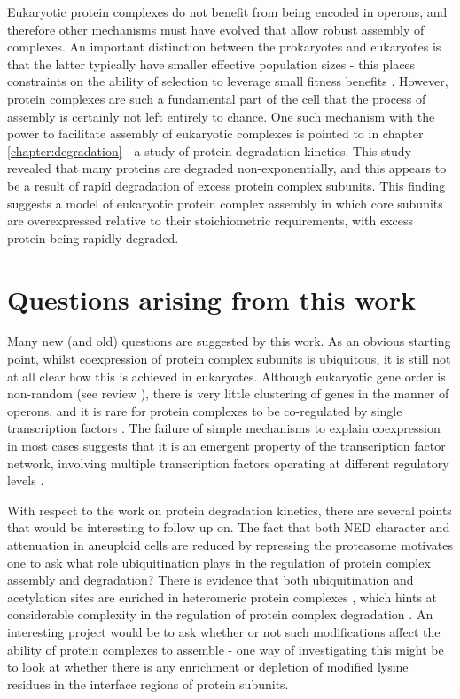 \documentclass[a4paper,11pt,twoside,openright]{scrbook}
\begin{document}
Eukaryotic protein complexes do not benefit from being encoded in operons, and therefore other mechanisms must have evolved that allow robust assembly of complexes. An important distinction between the prokaryotes and eukaryotes is that the latter typically have smaller effective population sizes - this places constraints on the ability of selection to leverage small fitness benefits \cite{Kimura1962,Lynch2011}. However, protein complexes are such a fundamental part of the cell that the process of assembly is certainly not left entirely to chance. One such mechanism with the power to facilitate assembly of eukaryotic complexes is pointed to in chapter \ref{chapter:degradation} - a study of protein degradation kinetics. This study revealed that many proteins are degraded non-exponentially, and this appears to be a result of rapid degradation of excess protein complex subunits. This finding suggests a model of eukaryotic protein complex assembly in which core subunits are overexpressed relative to their stoichiometric requirements, with excess protein being rapidly degraded.

\section{Questions arising from this work}
Many new (and old) questions are suggested by this work. As an obvious starting point, whilst coexpression of protein complex subunits is ubiquitous, it is still not at all clear how this is achieved in eukaryotes. Although eukaryotic gene order is non-random (see review \cite{Hurst2004}), there is very little clustering of genes in the manner of operons, and it is rare for protein complexes to be co-regulated by single transcription factors \cite{Tan2007}. The failure of simple mechanisms to explain coexpression in most cases suggests that it is an emergent property of the transcription factor network, involving multiple transcription factors operating at different regulatory levels \cite{Tsai2007,Muhammad2017}.

With respect to the work on protein degradation kinetics, there are several points that would be interesting to follow up on. The fact that both NED character and attenuation in aneuploid cells are reduced by repressing the proteasome motivates one to ask what role ubiquitination plays in the regulation of protein complex assembly and degradation? There is evidence that both ubiquitination and acetylation sites are enriched in heteromeric protein complexes \cite{Chen2014,Choudhary2009}, which hints at considerable complexity in the regulation of protein complex degradation \cite{Caron2005}. An interesting project would be to ask whether or not such modifications affect the ability of protein complexes to assemble - one way of investigating this might be to look at whether there is any enrichment or depletion of modified lysine residues in the interface regions of protein subunits.
\end{document}
